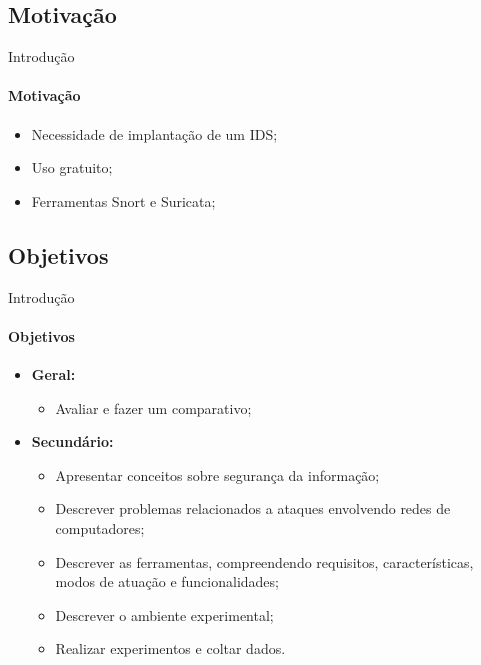 \documentclass[aspectratio=169]{beamer}
\begin{document}
\subsection{Motivação}
\begin{frame}{Introdução}
    \framesubtitle{Motivação}
    \begin{itemize}
        \item Necessidade de implantação de um IDS;
        \item Uso gratuito;
        \item Ferramentas Snort e Suricata;
    \end{itemize}
\end{frame}
\subsection{Objetivos}
\begin{frame}{Introdução}
    \framesubtitle{Objetivos}
    \begin{itemize}
        \item \textbf{Geral:} 
            \begin{itemize}
                \item Avaliar e fazer um comparativo;
            \end{itemize}
        \item \textbf{Secundário:} 
            \begin{itemize}
                \item Apresentar conceitos sobre segurança da informação; 
                \item Descrever problemas relacionados a ataques envolvendo redes de computadores;
                \item Descrever as ferramentas, compreendendo requisitos, características, modos de atuação e funcionalidades;
                \item Descrever o ambiente experimental;
                \item Realizar experimentos e coltar dados.
            \end{itemize}
    \end{itemize}
\end{frame}
\end{document}

